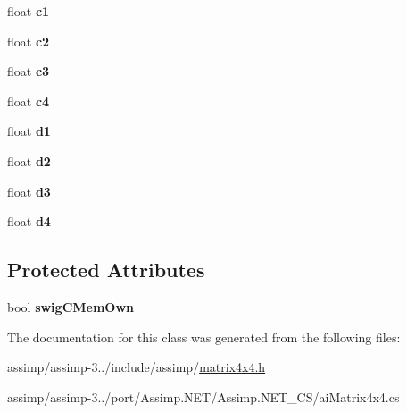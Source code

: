 \begin{DoxyCompactItemize}
\item 
\hypertarget{structai_matrix4x4_a63c847f6e86653143aa659f13c154e2b}{float {\bfseries c1}}\label{structai_matrix4x4_a63c847f6e86653143aa659f13c154e2b}

\item 
\hypertarget{structai_matrix4x4_a67425f81054b1097c29b73bf317cfeeb}{float {\bfseries c2}}\label{structai_matrix4x4_a67425f81054b1097c29b73bf317cfeeb}

\item 
\hypertarget{structai_matrix4x4_aec8c5745b90139d472eb4e91f1373c1a}{float {\bfseries c3}}\label{structai_matrix4x4_aec8c5745b90139d472eb4e91f1373c1a}

\item 
\hypertarget{structai_matrix4x4_a7e3288f38a4e00d55c02272e1582e462}{float {\bfseries c4}}\label{structai_matrix4x4_a7e3288f38a4e00d55c02272e1582e462}

\item 
\hypertarget{structai_matrix4x4_a13f3800d9106e3be6d0e60b794c5a5ae}{float {\bfseries d1}}\label{structai_matrix4x4_a13f3800d9106e3be6d0e60b794c5a5ae}

\item 
\hypertarget{structai_matrix4x4_a6f17ca1c7e4b9377d0e332f85aab282b}{float {\bfseries d2}}\label{structai_matrix4x4_a6f17ca1c7e4b9377d0e332f85aab282b}

\item 
\hypertarget{structai_matrix4x4_a8d2910f62b34b1e2ace93b55e4db4b92}{float {\bfseries d3}}\label{structai_matrix4x4_a8d2910f62b34b1e2ace93b55e4db4b92}

\item 
\hypertarget{structai_matrix4x4_ac0a65b51f126f7331b4f7dbbd82f3d63}{float {\bfseries d4}}\label{structai_matrix4x4_ac0a65b51f126f7331b4f7dbbd82f3d63}

\end{DoxyCompactItemize}
\subsection*{Protected Attributes}
\begin{DoxyCompactItemize}
\item 
\hypertarget{structai_matrix4x4_ac60cee41e245eff710f8e487b6161db9}{bool {\bfseries swig\+C\+Mem\+Own}}\label{structai_matrix4x4_ac60cee41e245eff710f8e487b6161db9}

\end{DoxyCompactItemize}


The documentation for this class was generated from the following files\+:\begin{DoxyCompactItemize}
\item 
assimp/assimp-\/3../include/assimp/\hyperlink{matrix4x4_8h}{matrix4x4.\+h}\item 
assimp/assimp-\/3../port/\+Assimp.\+N\+E\+T/\+Assimp.\+N\+E\+T\+\_\+\+C\+S/ai\+Matrix4x4.\+cs\end{DoxyCompactItemize}
